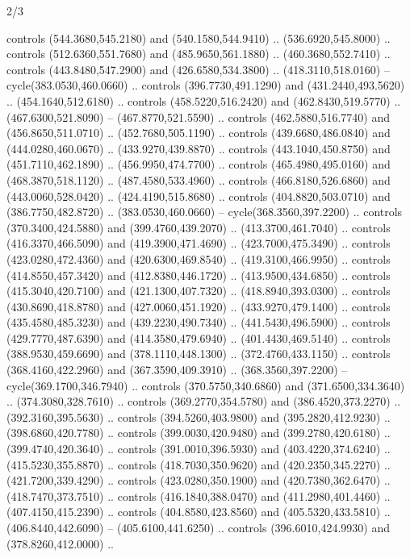 \begin{flagdescription}{2/3}
\begin{scope}[xshift=0.5\flaglength,yshift=0.5\flagwidth,scale=\flagwidth/638.38]
\begin{scope}[y=0.80pt, x=0.80pt, yscale=-1,shift={(-600,-400)}]
\begin{scope}[shift={(-0.02,2.173)}]
\begin{scope}[shift={(-1.081,0)}]
\begin{scope}[cm={{-1.0,0.0,0.0,1.0,(1202.2,0.0)}}]
  controls (544.3680,545.2180) and (540.1580,544.9410) .. (536.6920,545.8000) ..
  controls (512.6360,551.7680) and (485.9650,561.1880) .. (460.3680,552.7410) ..
  controls (443.8480,547.2900) and (426.6580,534.3800) .. (418.3110,518.0160) --
  cycle(383.0530,460.0660) .. controls (396.7730,491.1290) and
  (431.2440,493.5620) .. (454.1640,512.6180) .. controls (458.5220,516.2420) and
  (462.8430,519.5770) .. (467.6300,521.8090) -- (467.8770,521.5590) .. controls
  (462.5880,516.7740) and (456.8650,511.0710) .. (452.7680,505.1190) .. controls
  (439.6680,486.0840) and (444.0280,460.0670) .. (433.9270,439.8870) .. controls
  (443.1040,450.8750) and (451.7110,462.1890) .. (456.9950,474.7700) .. controls
  (465.4980,495.0160) and (468.3870,518.1120) .. (487.4580,533.4960) .. controls
  (466.8180,526.6860) and (443.0060,528.0420) .. (424.4190,515.8680) .. controls
  (404.8820,503.0710) and (386.7750,482.8720) .. (383.0530,460.0660) --
  cycle(368.3560,397.2200) .. controls (370.3400,424.5880) and
  (399.4760,439.2070) .. (413.3700,461.7040) .. controls (416.3370,466.5090) and
  (419.3900,471.4690) .. (423.7000,475.3490) .. controls (423.0280,472.4360) and
  (420.6300,469.8540) .. (419.3100,466.9950) .. controls (414.8550,457.3420) and
  (412.8380,446.1720) .. (413.9500,434.6850) .. controls (415.3040,420.7100) and
  (421.1300,407.7320) .. (418.8940,393.0300) .. controls (430.8690,418.8780) and
  (427.0060,451.1920) .. (433.9270,479.1400) .. controls (435.4580,485.3230) and
  (439.2230,490.7340) .. (441.5430,496.5900) .. controls (429.7770,487.6390) and
  (414.3580,479.6940) .. (401.4430,469.5140) .. controls (388.9530,459.6690) and
  (378.1110,448.1300) .. (372.4760,433.1150) .. controls (368.4160,422.2960) and
  (367.3590,409.3910) .. (368.3560,397.2200) -- cycle(369.1700,346.7940) ..
  controls (370.5750,340.6860) and (371.6500,334.3640) .. (374.3080,328.7610) ..
  controls (369.2770,354.5780) and (386.4520,373.2270) .. (392.3160,395.5630) ..
  controls (394.5260,403.9800) and (395.2820,412.9230) .. (398.6860,420.7780) ..
  controls (399.0030,420.9480) and (399.2780,420.6180) .. (399.4740,420.3640) ..
  controls (391.0010,396.5930) and (403.4220,374.6240) .. (415.5230,355.8870) ..
  controls (418.7030,350.9620) and (420.2350,345.2270) .. (421.7200,339.4290) ..
  controls (423.0280,350.1900) and (420.7380,362.6470) .. (418.7470,373.7510) ..
  controls (416.1840,388.0470) and (411.2980,401.4460) .. (407.4150,415.2390) ..
  controls (404.8580,423.8560) and (405.5320,433.5810) .. (406.8440,442.6090) --
  (405.6100,441.6250) .. controls (396.6010,424.9930) and (378.8260,412.0000) ..

\end{scope}
\end{scope}
\end{scope}
\end{scope}
\end{scope}
\end{flagdescription}
